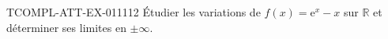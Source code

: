 \begin{exercice}{TCOMPL-ATT-EX-011}{1}{12}
Étudier les variations de $f(x) = \mathrm{e}^x - x$ sur $\mathbb{R}$ et déterminer ses limites en $\pm\infty$.

\end{exercice}
